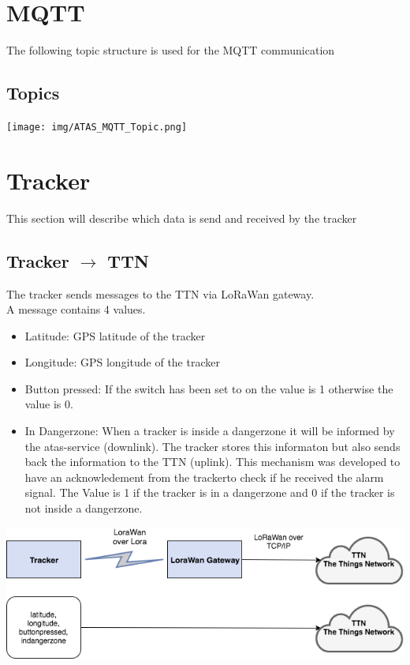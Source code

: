 \documentclass[a4paper,11pt, oneside]{report}
\theoremstyle{definition}
\begin{document}
\section{MQTT}
The following topic structure is used for the MQTT communication
\subsection{Topics}
\texttt{[image: img/ATAS\_MQTT\_Topic.png]}

\newpage
\section{Tracker}
This section will describe which data is send and received by the tracker\\
\subsection{Tracker $\rightarrow$ TTN}
The tracker sends messages to the TTN via LoRaWan gateway.\\
A message contains 4 values.
\begin{itemize}
\item Latitude: GPS latitude of the tracker
\item Longitude: GPS longitude of the tracker
\item Button pressed: If the switch has been set to on the value is 1 otherwise the value is 0.
\item In Dangerzone: When a tracker is inside a dangerzone it will be informed by the atas-service (downlink). The tracker stores this informaton but also sends back the information to the TTN (uplink). This mechanism was developed to have an acknowledement from the trackerto check  if he received the alarm signal. The Value is 1 if the tracker is in a dangerzone and 0 if the tracker is not inside a dangerzone.
\end{itemize}
\includegraphics[width=\textwidth]{img/atas-tracker2ttn.png}\\
\end{document}

